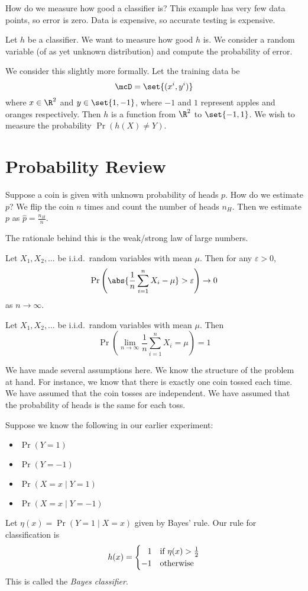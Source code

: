 How do we measure how good a classifier is?
This example has very few data points, so error is zero.
Data is expensive, so accurate testing is expensive.

Let $h$ be a classifier.
We want to measure how good $h$ is.
We consider a random variable (of as yet unknown distribution) and compute
the probability of error.

We consider this slightly more formally.
Let the training data be \[
    \mcD = \set{(x^i, y^i)}
\] where $x \in \R^2$ and $y \in \set{1, -1}$, where $-1$ and $1$ represent
apples and oranges respectively.
Then $h$ is a function from $\R^2$ to $\set{-1, 1}$.
We wish to measure the probability $\Pr(h(X) \ne Y)$.

\section{Probability Review} \label{sec:probability_review}
Suppose a coin is given with unknown probability of heads $p$.
How do we estimate $p$?
We flip the coin $n$ times and count the number of heads $n_H$.
Then we estimate $p$ as $\hat{p} = \frac{n_H}{n}$.

The rationale behind this is the weak/strong law of large numbers.
\begin{theorem} \label{thm:probability_review:wlln}
    Let $X_1, X_2, \ldots$ be i.i.d.~random variables with mean $\mu$.
    Then for any $\varepsilon > 0$, \[
        \Pr\left(\abs{\frac{1}{n} \sum_{i=1}^n X_i - \mu} > \varepsilon\right)
        \to 0
    \] as $n \to \infty$.
\end{theorem}

\begin{theorem} \label{thm:probability_review:slln}
    Let $X_1, X_2, \ldots$ be i.i.d.~random variables with mean $\mu$.
    Then \[
        \Pr\left(\lim_{n \to \infty} \frac{1}{n} \sum_{i=1}^n X_i = \mu\right)
        = 1
    \]
\end{theorem}
We have made several assumptions here.
We know the structure of the problem at hand.
For instance, we know that there is exactly one coin tossed each time.
We have assumed that the coin tosses are independent.
We have assumed that the probability of heads is the same for each toss.

Suppose we know the following in our earlier experiment:
\begin{itemize}
    \item $\Pr(Y = 1)$
    \item $\Pr(Y = -1)$
    \item $\Pr(X = x \mid Y = 1)$
    \item $\Pr(X = x \mid Y = -1)$
\end{itemize}
Let $\eta(x) = \Pr(Y = 1 \mid X = x)$ given by Bayes' rule.
Our rule for classification is \[
    h(x) = \begin{cases}
        \hphantom{-}1 & \text{if } \eta(x) > \frac{1}{2} \\
        -1 & \text{otherwise}
    \end{cases}
\] This is called the \emph{Bayes classifier}.

